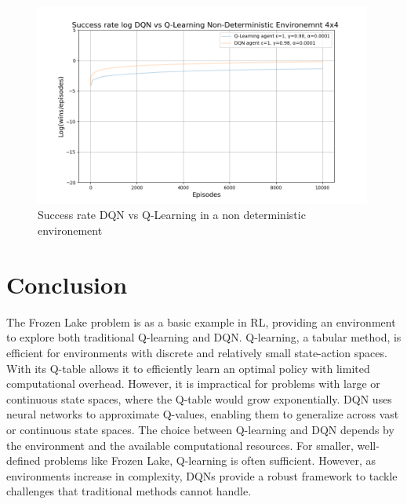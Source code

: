 \begin{figure}[H]
    \centering
    \includegraphics[width=0.99\textwidth]{images/success_rate_log_dqn_vs_q-learning_nd_4x4.png}
    \caption{Success rate DQN vs Q-Learning in a non deterministic environement}
    \label{fig:success_rate_log_dqn_vs_q-learning_nd_4x4}
\end{figure}

\section{Conclusion}
The Frozen Lake problem is as a basic example in RL, providing an environment to explore both traditional Q-learning and DQN. 
Q-learning, a tabular method, is efficient for environments with discrete and relatively small state-action spaces. 
With its Q-table allows it to efficiently learn an optimal policy with limited computational overhead. 
However, it is impractical for problems with large or continuous state spaces, where the Q-table would grow exponentially.
DQN uses neural networks to approximate Q-values, enabling them to generalize across vast or continuous state spaces. 
The choice between Q-learning and DQN depends by the environment and the available computational resources. 
For smaller, well-defined problems like Frozen Lake, Q-learning is often sufficient. 
However, as environments increase in complexity, DQNs provide a robust framework to tackle challenges that traditional methods cannot handle.
